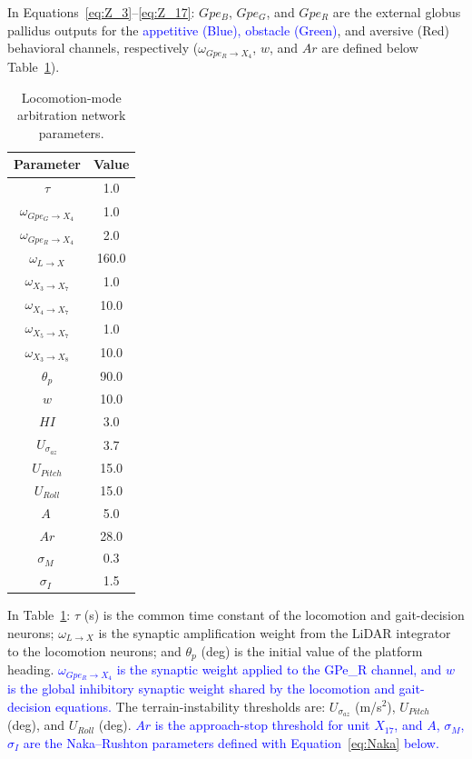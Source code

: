 \documentclass[preprint,12pt]{elsarticle}
\newcommand{\revblue}[1]{\textcolor{blue}{#1}}
\begin{document}
In Equations~\eqref{eq:Z_3}--\eqref{eq:Z_17}: $Gpe_B$, $Gpe_G$, and $Gpe_R$ are the external globus pallidus outputs for the \revblue{appetitive (Blue), obstacle (Green)}, and aversive (Red) behavioral channels, respectively ($\omega_{Gpe_R \rightarrow X_4}$, $w$, and $Ar$ are defined below Table~\ref{table:Locom_NN}).

\begin{table}[t]
\centering
\caption{Locomotion-mode arbitration network parameters.}
\begin{tabular}{|c|c|}
\hline
\textbf{Parameter} & \textbf{Value} \\ \hline
$\tau$ & 1.0 \\ \hline

$\omega_{Gpe_G \rightarrow X_4}$ & 1.0 \\ \hline
$\omega_{Gpe_R \rightarrow X_4}$ & 2.0 \\ \hline

$\omega_{L \rightarrow X}$ & 160.0 \\ \hline

$\omega_{X_3 \rightarrow X_7}$ & 1.0 \\ \hline
$\omega_{X_4 \rightarrow X_7}$ & 10.0 \\ \hline
$\omega_{X_5 \rightarrow X_7}$ & 1.0 \\ \hline

$\omega_{X_3 \rightarrow X_8}$ & 10.0 \\ \hline

$\theta_{p}$ & 90.0 \\ \hline

$w$ & 10.0 \\ \hline

$HI$ & 3.0 \\ \hline

$U_{\sigma_{az}}$ & 3.7 \\ \hline
$U_{Pitch}$ & 15.0 \\ \hline
$U_{Roll}$ & 15.0 \\ \hline
$A\ $ & 5.0 \\ \hline
$ Ar $ & 28.0 \\ \hline
$\sigma_{M}\ $ & 0.3 \\ \hline
$\sigma_{I}\ $ & 1.5 \\ \hline
\end{tabular}
\label{table:Locom_NN}
\end{table}

In Table~\ref{table:Locom_NN}: $\tau$ (s) is the common time constant of the locomotion and gait-decision neurons; $\omega_{L\rightarrow X}$ is the synaptic amplification weight from the LiDAR integrator to the locomotion neurons; and $\theta_{p}$ (deg) is the initial value of the platform heading.
\revblue{$\omega_{Gpe_R \rightarrow X_4}$ is the synaptic weight applied to the GPe\_R channel, and $w$ is the global inhibitory synaptic weight shared by the locomotion and gait-decision equations.}
The terrain-instability thresholds are: $U_{\sigma_{az}}$ (m/s$^2$), $U_{Pitch}$ (deg), and $U_{Roll}$ (deg).
\revblue{$Ar$ is the approach-stop threshold for unit $X_{17}$, and $A$, $\sigma_{M}$, $\sigma_{I}$ are the Naka--Rushton parameters defined with Equation~\eqref{eq:Naka} below.}
\end{document}
